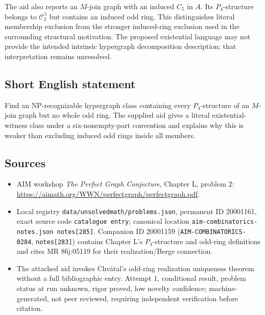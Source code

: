 \documentclass[11pt]{article}
\begin{document}
The aid also reports an $M$-join graph with an induced $C_5$ in $A$. Its $P_4$-structure belongs to $\mathcal C_2^{\exists}$ but contains an induced odd ring. This distinguishes literal membership exclusion from the stronger induced-ring exclusion used in the surrounding structural motivation. The proposed existential language may not provide the intended intrinsic hypergraph decomposition description; that interpretation remains unresolved.
\subsection{Short English statement}
Find an NP-recognizable hypergraph class containing every $P_4$-structure of an $M$-join graph but no whole odd ring. The supplied aid gives a literal existential-witness class under a six-nonempty-part convention and explains why this is weaker than excluding induced odd rings inside all members.
\subsection{Sources}
\begin{itemize}
\item AIM workshop \emph{The Perfect Graph Conjecture}, Chapter L, problem 2: \url{https://aimath.org/WWN/perfectgraph/perfectgraph.pdf}.
\item Local registry \texttt{data/unsolvedmath/problems.json}, permanent ID 20001161, exact source code \texttt{catalogue entry}; canonical location \texttt{aim-combinatorics-notes.json notes[285]}. Companion ID 20001159 (\texttt{AIM-COMBINATORICS-0284}, \texttt{notes[283]}) contains Chapter L's $P_4$-structure and odd-ring definitions and cites MR 86j:05119 for their realization/Berge connection.
\item The attached aid invokes Chv\'atal's odd-ring realization uniqueness theorem without a full bibliographic entry. Attempt 1, conditional result, problem status at run unknown, rigor proved, low novelty confidence; machine-generated, not peer reviewed, requiring independent verification before citation.
\end{itemize}
\end{document}
